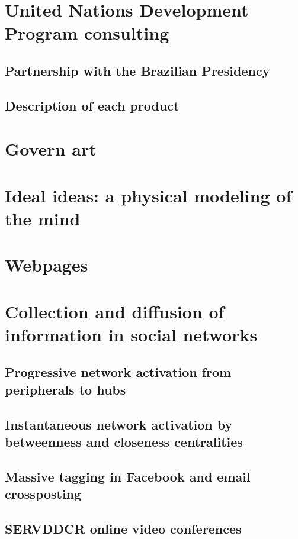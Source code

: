 \begin{apendicesenv}
\section{United Nations Development Program consulting}
\subsection{Partnership with the Brazilian Presidency}
\subsection{Description of each product}
\section{Govern art}
\section{Ideal ideas: a physical modeling of the mind}
\section{Webpages}
\section{Collection and diffusion of information in social networks}
\subsection{Progressive network activation from peripherals to hubs}
\subsection{Instantaneous network activation by betweenness and closeness centralities}
\subsection{Massive tagging in Facebook and email crossposting}
\subsection{SERVDDCR online video conferences}

\end{apendicesenv}
